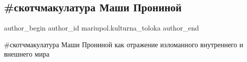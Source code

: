  
 
 
 
 

\subsection{\#скотчмакулатура Маши Прониной}
\label{sec:27_01_2019.fb.mariupol.kulturna_toloka.1.skotchmakulatura_mashi_proninoj}

\ifcmt
 author_begin
   author_id mariupol.kulturna_toloka
 author_end
\fi

\#скотчмакулатура Маши Прониной как отражение изломанного внутреннего и внешнего мира
